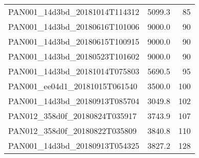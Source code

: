 \begin{tabular}{lrr}
PAN001\_14d3bd\_20181014T114312 &     5099.3 &       85 \\
PAN001\_14d3bd\_20180616T101006 &     9000.0 &       90 \\
PAN001\_14d3bd\_20180615T100915 &     9000.0 &       90 \\
PAN001\_14d3bd\_20180523T101602 &     9000.0 &       90 \\
PAN001\_14d3bd\_20181014T075803 &     5690.5 &       95 \\
PAN001\_ee04d1\_20181015T061540 &     3500.0 &      100 \\
PAN001\_14d3bd\_20180913T085704 &     3049.8 &      102 \\
PAN012\_358d0f\_20180824T035917 &     3743.9 &      107 \\
PAN012\_358d0f\_20180822T035809 &     3840.8 &      110 \\
PAN001\_14d3bd\_20180913T054325 &     3827.2 &      128 \\
\bottomrule
\end{tabular}
